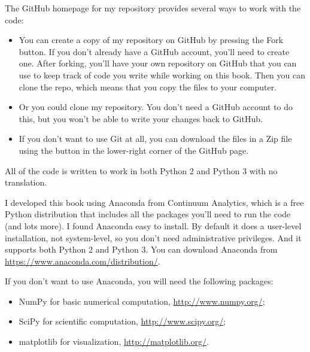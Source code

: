 \documentclass[12pt]{book} \usepackage[width=5.5in,height=8.5in, hmarginratio=3:2,vmarginratio=1:1]{geometry}
\begin{document}
The GitHub homepage for my repository provides several ways to work with the code: 

\begin{itemize} 

\item You can create a copy of my repository on GitHub by pressing the {\sf Fork} button. If you don't already have a GitHub account, you'll need to create one. After forking, you'll have your own repository on GitHub that you can use to keep track of code you write while working on this book. Then you can clone the repo, which means that you copy the files to your computer.  

\item Or you could clone my repository. You don't need a GitHub account to do this, but you won't be able to write your changes back to GitHub.  

\item If you don't want to use Git at all, you can download the files in a Zip file using the button in the lower-right corner of the GitHub page. 

\end{itemize} 

All of the code is written to work in both Python 2 and Python 3 with no translation. 

I developed this book using Anaconda from Continuum Analytics, which is a free Python distribution that includes all the packages you'll need to run the code (and lots more). I found Anaconda easy to install. By default it does a user-level installation, not system-level, so you don't need administrative privileges. And it supports both Python 2 and Python 3. You can download Anaconda from \url{https://www.anaconda.com/distribution/}.  

If you don't want to use Anaconda, you will need the following packages: 

\begin{itemize} 

\item NumPy for basic numerical computation, \url{http://www.numpy.org/};  

\item SciPy for scientific computation, \url{http://www.scipy.org/};  

\item matplotlib for visualization, \url{http://matplotlib.org/}.  

\end{itemize} 
\end{document}
